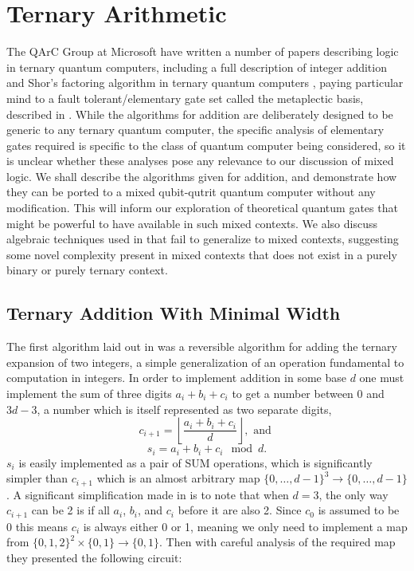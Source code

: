 \chapter[TERNARY ARITHMETIC]{Ternary Arithmetic}\label{ternary}
The QArC Group at Microsoft have written a number of papers describing logic in ternary quantum computers, including a full description of integer addition and Shor's factoring algorithm in ternary quantum computers \cite{arithmetics, shor-qutrit}, paying particular mind to a fault tolerant/elementary gate set called the metaplectic basis, described in \cite{universal-anyon, topological-anyon-thing}. While the algorithms for addition are deliberately designed to be generic to any ternary quantum computer, the specific analysis of elementary gates required is specific to the class of quantum computer being considered, so it is unclear whether these analyses pose any relevance to our discussion of mixed logic. We shall describe the algorithms given for addition, and demonstrate how they can be ported to a mixed qubit-qutrit quantum computer without any modification. This will inform our exploration of theoretical quantum gates that might be powerful to have available in such mixed contexts. We also discuss algebraic techniques used in \cite{arithmetics} that fail to generalize to mixed contexts, suggesting some novel complexity present in mixed contexts that does not exist in a purely binary or purely ternary context.

\section{Ternary Addition With Minimal Width}
The first algorithm laid out in \cite{arithmetics} was a reversible algorithm for adding the ternary expansion of two integers, a simple generalization of an operation fundamental to computation in integers. In order to implement addition in some base $d$ one must implement the sum of three digits $a_i + b_i + c_i$ to get a number between $0$ and $3d-3$, a number which is itself represented as two separate digits,
\[c_{i+1} = \left\lfloor \frac{a_i + b_i + c_i}{d} \right\rfloor, \text{\ and\ }
\]\[s_i = a_i + b_i + c_i \mod d.\]
$s_i$ is easily implemented as a pair of SUM operations, which is significantly simpler than $c_{i+1}$ which is an almost arbitrary map $\{0,\dots,d-1\}^3 \to \{0,\dots,d-1\}$. A significant simplification made in \cite{arithmetics} is to note that when $d=3$, the only way $c_{i+1}$ can be 2 is if all $a_i$, $b_i$, and $c_i$ before it are also 2. Since $c_0$ is assumed to be 0 this means $c_i$ is always either 0 or 1, meaning we only need to implement a map from $\{0,1,2\}^2\times\{0,1\} \to \{0, 1\}$. Then with careful analysis of the required map they presented the following circuit:

